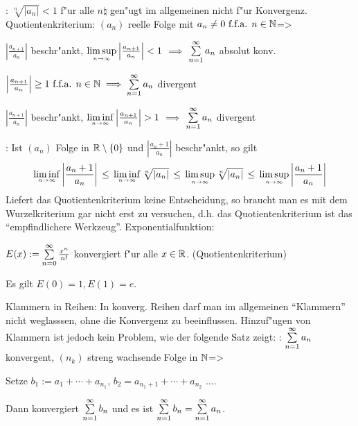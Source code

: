 \remark:{
  $\sqrt[n]{|a_n|}<1$ f"ur alle $n\natural$ gen"ugt im allgemeinen nicht
  f"ur Konvergenz.
  }
\theorem Quotientenkriterium:
  $(a_n)$ reelle Folge mit $a_n\ne 0 \text{ f.f.a. } n\in\mathbb N$=>{
  \begin{stmts}
    \item $\left|\frac {a_{n+1}}{a_n}\right|$ beschr"ankt,
          $\limsupn \left|\frac {a_{n+1}}{a_n}\right|<1$ $\implies$
          $\sumn 1 a_n$ absolut konv.
    \item $\left|\frac {a_{n+1}}{a_n}\right|\ge 1\ffa n\natural \implies \sumn 1 a_n$
          divergent
    \item $\left|\frac{a_{n+1}}{a_n}\right|$ beschr"ankt,
          $\liminfn \left|\frac{a_{n+1}}{a_n}\right|>1$ $\implies$
          $\sumn 1 a_n$ divergent
    \end{stmts}
  }
\remark:{
  Ist $(a_n)$ Folge in $\mathbb R\setminus\{0\}$ und $\left|\frac{a_n+1}{a_n}\right|$
  beschr"ankt, so gilt
  \[\liminfn \left|\frac {a_n+1}{a_n}\right| \, \le \,
    \liminfn \root n \of{|a_n|} \, \le \,
    \limsupn \root n \of{|a_n|} \, \le \,
    \limsupn \left|\frac {a_n+1}{a_n}\right|
    \]
  Liefert das Quotientenkriterium keine Entscheidung, so braucht man
  es mit dem Wurzelkriterium gar nicht erst zu versuchen, d.h. das
  Quotientenkriterium ist das ``empfindlichere Werkzeug''.
}
\example Exponentialfunktion:{
  $E(x):=\sumn 0 \frac {x^n}{n!}$ konvergiert f"ur alle $x\in\mathbb R$.
  (Quotientenkriterium)
  
  Es gilt $E(0)=1, E(1)=e$.
  }
\remark Klammern in Reihen:{
  In konverg. Reihen darf man im allgemeinen ``Klammern'' nicht weglasssen,
  ohne die Konvergenz zu beeinflussen. Hinzuf"ugen von Klammern ist jedoch
  kein Problem, wie der folgende Satz zeigt:
  }
\theorem:
  $\sumn 1 a_n$ konvergent, $(n_k)$ streng wachsende Folge in $\mathbb N$=>{
  Setze $b_1:=a_1+\cdots+a_{n_1}$, $b_2=a_{n_1+1}+\cdots+a_{n_2}$ $\ldots$.
  
  Dann konvergiert $\sumn 1 b_n$ und es ist $\sumn 1 b_n = \sumn 1 a_n$.
  }
